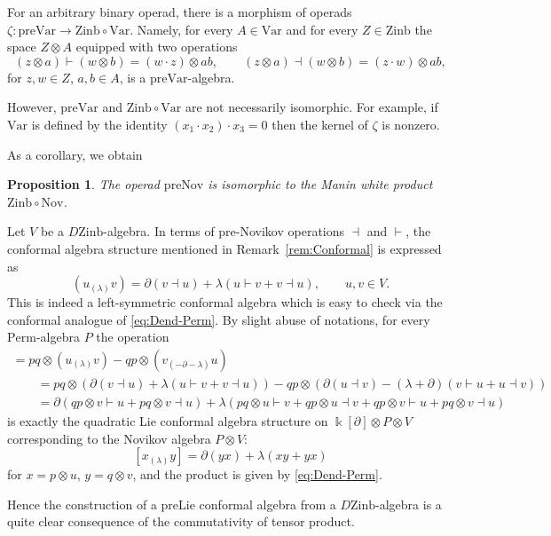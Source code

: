\documentclass[11pt]{article}
\numberwithin{equation}{section}
\numberwithin{equation}{section}
\newtheorem{Proposition}[Theorem]{Proposition}
 { \theoremstyle{definition}
\newtheorem{Definition}[Theorem]{Definition}
\newtheorem{Note}[Theorem]{Note}
\newtheorem{Example}[Theorem]{Example}
\newtheorem{Remark}[Theorem]{Remark} }
\def\Var{\mathrm{Var}}
\def\Nov{\mathrm{Nov}}
\def\Lie{\mathrm{Lie}}
\def\Perm{\mathrm{Perm}}
\def\Zinb{\mathrm{Zinb}}
\def\pre{\mathrm{pre}}
\begin{document}
\begin{Remark}
For an arbitrary binary operad,
there is a morphism of operads
$\zeta\colon \pre\Var \to \Zinb\circ \Var $. Namely,
for every $A\in \Var $ and for every $Z\in \Zinb$
the space $Z\otimes A$ equipped with two operations
\[
(z\otimes a)\vdash (w\otimes b) = (w\cdot z)\otimes ab,
\qquad
(z\otimes a)\dashv (w\otimes b) = (z\cdot w)\otimes ab,
\]
for $z,w\in Z$, $a,b\in A$, is a $\pre\Var $-algebra.

However, $\pre\Var $ and $\Zinb\circ \Var $ are
not necessarily isomorphic. For example,
if $\Var $ is defined by the identity $(x_1\cdot x_2)\cdot x_3=0$
then the kernel of $\zeta $ is nonzero.
\end{Remark}

As a corollary, we obtain

\begin{Proposition}%
The operad $\pre\Nov $
is isomorphic to the Manin white product $\Zinb\circ \Nov$.
\end{Proposition}

\begin{Remark}
Let $V$ be a $D\Zinb$-algebra.
In terms of pre-Novikov operations $\dashv$ and $\vdash$, the conformal algebra structure mentioned in
Remark~\ref{rem:Conformal} is expressed as
\[
(u_{(\lambda)} v) = \partial (v\dashv u) + \lambda (u\vdash v + v\dashv u),
\qquad u,v\in V.
\]
This is indeed a left-symmetric conformal algebra which is easy
to check via the conformal analogue of \eqref{eq:Dend-Perm}.
By slight abuse of notations,
for every $\Perm $-algebra $P$ the operation
%
\begin{gather*}
[(p\otimes u)_{(\lambda) } (q\otimes v)]
= pq \otimes (u_{(\lambda )} v) - qp\otimes (v_{(-\partial-\lambda )} u) \\
\qquad{}=pq\otimes (\partial (v\dashv u) + \lambda (u\vdash v + v\dashv u))
-qp\otimes (\partial (u\dashv v) - (\lambda+\partial) (v\vdash u + u\dashv v))\\
\qquad{}=\partial (qp\otimes v\vdash u+pq\otimes v\dashv u)
+\lambda (pq\otimes u\vdash v +qp\otimes u\dashv v
+ qp\otimes v\vdash u + pq\otimes v\dashv u)
\end{gather*}
%
is exactly the quadratic Lie conformal algebra structure \cite{Xu1999}
on $\Bbbk [\partial ]\otimes P\otimes V$
corresponding to the Novikov algebra $P\otimes V$:
\[
[x_{(\lambda )} y] = \partial (y x) + \lambda (x y + y x)
\]
for $x=p\otimes u$, $y=q\otimes v$, and the product
is given by \eqref{eq:Dend-Perm}.

Hence the construction of a $\pre\Lie$ conformal algebra from a
$D\Zinb $-algebra is a quite clear consequence of
the commutativity of tensor product.
\end{Remark}
\end{document}
